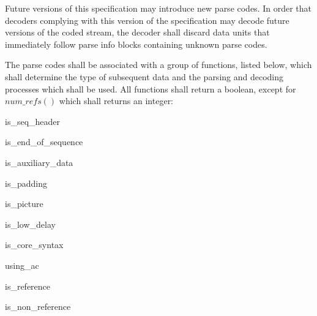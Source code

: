 Future versions of this specification may introduce new parse codes. In order that 
decoders complying with this version of the specification may decode future 
versions of the coded stream, the decoder shall discard data units that immediately 
follow parse info blocks containing unknown parse codes. 

The parse codes shall be associated with a group of functions, listed below, which shall determine the type of subsequent data and the parsing and decoding processes which 
shall be used. All functions shall return a
boolean, except for $num\_refs()$ which shall returns an integer:

\begin{pseudo}{is\_seq\_header}{}
\end{pseudo}

\begin{pseudo}{is\_end\_of\_sequence}{}
\end{pseudo}

\begin{pseudo}{is\_auxiliary\_data}{}
\end{pseudo}

\begin{pseudo}{is\_padding}{}
\end{pseudo}

\begin{pseudo}{is\_picture}{}
\end{pseudo}

\begin{pseudo}{is\_low\_delay}{}
\end{pseudo}

\begin{pseudo}{is\_core\_syntax}{}
\end{pseudo}

\begin{pseudo}{using\_ac}{}
\end{pseudo}

\begin{pseudo}{is\_reference}{}
\end{pseudo}

\begin{pseudo}{is\_non\_reference}{}
\end{pseudo}

